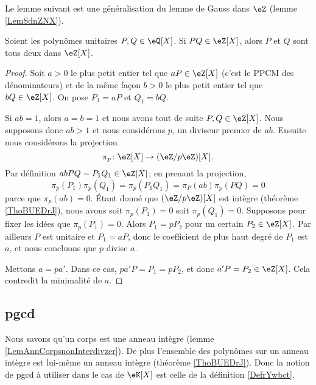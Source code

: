 Le lemme suivant est une généralisation du lemme de Gauss dans \( \eZ\) (lemme \ref{LemSdnZNX}).
\begin{lemma}       \label{LemEfdkZw}   
    Soient les polynômes unitaires \( P,Q\in \eQ[X]\). Si \( PQ\in\eZ[X]\), alors \( P\) et \( Q\) sont tous deux dans \( \eZ[X]\).
\end{lemma}

\begin{proof}
    Soit \( a>0\) le plus petit entier tel que \( aP\in\eZ[X]\) (c'est le PPCM des dénominateurs) et de la même façon \( b>0\) le plus petit entier tel que \( bQ\in \eZ[X]\). On pose \( P_1=aP\) et \( Q_1=bQ\).

    Si \( ab=1\), alors \( a=b=1\) et nous avons tout de suite \( P,Q\in \eZ[X]\). Nous supposons donc \( ab>1\) et nous considérons \( p\), un diviseur premier de \( ab\). Ensuite nous considérons la projection
    \begin{equation}
        \pi_p\colon \eZ[X]\to (\eZ/p\eZ)[X].
    \end{equation}
    Par définition \( abPQ=P_1Q_1\in \eZ[X]\); en prenant la projection,
    \begin{equation}
        \pi_p(P_1)\pi_p(Q_1)=\pi_p(P_1Q_1)=\pi_P(ab)\pi_p(PQ)=0
    \end{equation}
    parce que \( \pi_p(ab)=0\). Étant donné que \( (\eZ/p\eZ)[X]\) est intègre (théorème \ref{ThoBUEDrJ}), nous avons soit \( \pi_p(P_1)=0\) soit \( \pi_p(Q_1)=0\). Supposons pour fixer les idées que \( \pi_p(P_1)=0\). Alors \( P_1=pP_2\) pour un certain \( P_2\in \eZ[X]\). Par ailleurs \( P\) est unitaire et \( P_1=aP\), donc le coefficient de plus haut degré de \( P_1\) est \( a\), et nous concluons que \( p\) divise \( a\).
    
    Mettons \( a=pa'\). Dans ce cas, \( pa'P=P_1=pP_2\), et donc \( a'P=P_2\in \eZ[X]\). Cela contredit la minimalité de \( a\).
\end{proof}

\subsection{pgcd}

Nous savons qu'un corps est une anneau intègre (lemme \ref{LemAnnCorpsnonInterdivzer}). De plus l'ensemble des polynômes sur un anneau intègre est lui-même un anneau intègre (théorème \ref{ThoBUEDrJ}). Donc la notion de pgcd à utiliser dans le cas de \( \eK[X]\) est celle de la définition \ref{DefrYwbct}.

